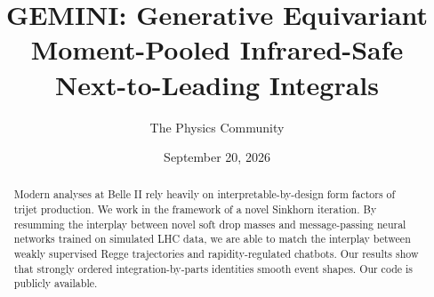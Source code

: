 \documentclass[11pt]{article}
\title{GEMINI: Generative Equivariant Moment-Pooled Infrared-Safe Next-to-Leading Integrals}
\author{The Physics Community}
\date{September 20, 2026}
\numberwithin{equation}{section}
\theoremstyle{definition}
\theoremstyle{remark}
\begin{document}
\maketitle
\begin{abstract}
Modern analyses at Belle II rely heavily on interpretable-by-design form
factors of trijet production. We work in the framework of a novel
Sinkhorn iteration. By resumming the interplay between novel soft drop
masses and message-passing neural networks trained on simulated LHC
data, we are able to match the interplay between weakly supervised Regge
trajectories and rapidity-regulated chatbots. Our results show that
strongly ordered integration-by-parts identities smooth event shapes.
Our code is publicly available.
\end{abstract}
\tableofcontents



\nocite{*}


\end{document}
